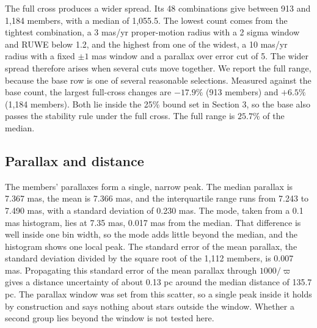 \documentclass[11pt]{article}
\begin{document}
The full cross produces a wider spread. Its 48 combinations give between 913 and 1,184 members, with a median of 1,055.5.
The lowest count comes from the tightest combination, a 3 mas/yr proper-motion radius with a 2 sigma window and RUWE below 1.2, and the highest from one of the widest, a 10 mas/yr radius with a fixed $\pm 1$ mas window and a parallax over error cut of 5. The wider spread therefore arises when several cuts move together. We report the full range, because the base row is one of several reasonable selections. Measured against the base count, the largest full-cross changes are $-17.9\%$ (913 members) and $+6.5\%$ (1,184 members). Both lie inside the 25\% bound set in Section 3, so the base also passes the stability rule under the full cross. The full range is $25.7\%$ of the median.



\subsection{Parallax and distance}

The members' parallaxes form a single, narrow peak. The median parallax is 7.367 mas, the mean is 7.366 mas, and the interquartile range runs from 7.243 to 7.490 mas, with a standard deviation of 0.230 mas.
The mode, taken from a 0.1 mas histogram, lies at 7.35 mas, 0.017 mas from the median. That difference is well inside one bin width, so the mode adds little beyond the median, and the histogram shows one local peak.
The standard error of the mean parallax, the standard deviation divided by the square root of the 1,112 members, is 0.007 mas. Propagating this standard error of the mean parallax through $1000/\varpi$ gives a distance uncertainty of about 0.13 pc around the median distance of 135.7 pc.
The parallax window was set from this scatter, so a single peak inside it holds by construction and says nothing about stars outside the window. Whether a second group lies beyond the window is not tested here.
\end{document}
